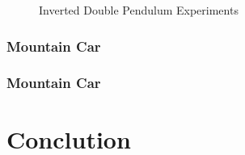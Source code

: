 \documentclass[journal]{IEEEtran}
\begin{document}
\begin{figure}[H]
\begin{subfigure}[b]{0.5\textwidth}
    \end{subfigure}
    \caption{Inverted Double Pendulum Experiments}
    \label{fig:Double Pendulum}
\end{figure}


\subsubsection{Mountain Car}
\subsubsection{}
\subsubsection{Mountain Car}
\subsubsection{}


\section{Conclution}






\end{document}

